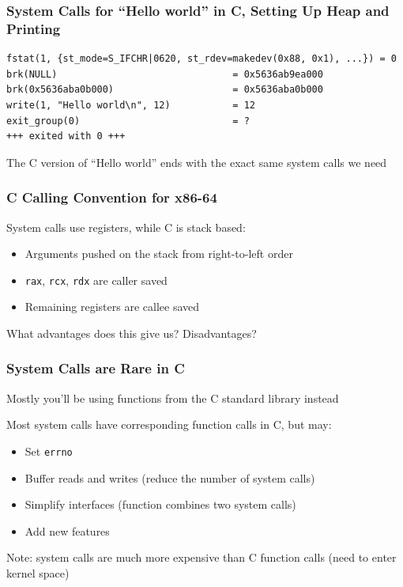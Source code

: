\documentclass[aspectratio=169]{beamer}
\begin{document}
  \begin{frame}[fragile]
    \frametitle{System Calls for ``Hello world'' in C, Setting Up Heap and
                Printing}

    \begin{lstlisting}[basicstyle=\ttfamily\footnotesize]
fstat(1, {st_mode=S_IFCHR|0620, st_rdev=makedev(0x88, 0x1), ...}) = 0
brk(NULL)                               = 0x5636ab9ea000
brk(0x5636aba0b000)                     = 0x5636aba0b000
write(1, "Hello world\n", 12)           = 12
exit_group(0)                           = ?
+++ exited with 0 +++
    \end{lstlisting}

    \vspace{1em}
    The C version of ``Hello world'' ends with the exact same system calls we
    need
  \end{frame}

  \begin{frame}
    \frametitle{C Calling Convention for x86-64}

    System calls use registers, while C is stack based:
    \begin{itemize}
      \item Arguments pushed on the stack from right-to-left order
      \item \texttt{rax}, \texttt{rcx}, \texttt{rdx} are caller saved
      \item Remaining registers are callee saved
    \end{itemize}

    \vspace{2em}
    What advantages does this give us? Disadvantages?
  \end{frame}

  \begin{frame}
    \frametitle{System Calls are Rare in C}

    Mostly you'll be using functions from the C standard library instead

    \vspace{1em}

    Most system calls have corresponding function calls in C, but may:
    \begin{itemize}
      \item Set \texttt{errno}
      \item Buffer reads and writes (reduce the number of system calls)
      \item Simplify interfaces (function combines two system calls)
      \item Add new features
    \end{itemize}

    \vspace{1em}

    Note: system calls are much more expensive than C function calls (need to
    enter kernel space)
  \end{frame}
\end{document}
